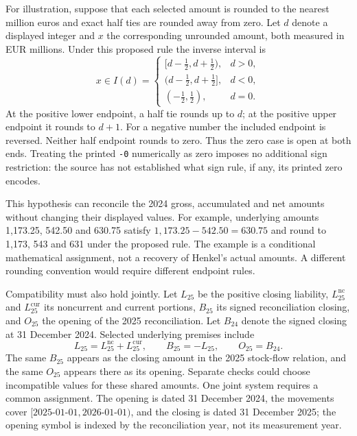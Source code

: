 For illustration, suppose that each selected amount is rounded to the nearest
million euros and exact half ties are rounded away from zero. Let $d$ denote
a displayed integer and $x$ the corresponding unrounded amount, both measured
in EUR millions. Under this proposed rule the inverse interval is
\begin{equation}
\label{eq:henkel-proposed-rounding}
 x\in I(d)=
 \begin{cases}
 [d-\tfrac12,d+\tfrac12),&d>0,\\
 (d-\tfrac12,d+\tfrac12],&d<0,\\
 (-\tfrac12,\tfrac12),&d=0.
 \end{cases}
\end{equation}
At the positive lower endpoint, a half tie rounds up to $d$; at the positive
upper endpoint it rounds to $d+1$. For a negative number the included endpoint
is reversed. Neither half endpoint rounds to zero. Thus the zero case is open
at both ends. Treating the printed \texttt{-0} numerically as zero imposes no
additional sign restriction: the source has not established what sign rule,
if any, its printed zero encodes.

This hypothesis can reconcile the 2024 gross, accumulated and net amounts
without changing their displayed values. For example, underlying amounts
1,173.25, 542.50 and 630.75 satisfy
$1{,}173.25-542.50=630.75$ and round to 1,173, 543 and 631 under the proposed
rule. The example is a conditional mathematical assignment, not a recovery
of Henkel's actual amounts. A different rounding convention would require
different endpoint rules.

Compatibility must also hold jointly. Let $L_{25}$ be the positive closing
liability, $L^{\mathrm{nc}}_{25}$ and $L^{\mathrm{cur}}_{25}$ its noncurrent and
current portions, $B_{25}$ its signed reconciliation closing, and $O_{25}$
the opening of the 2025 reconciliation. Let $B_{24}$
denote the signed closing at 31 December 2024. Selected underlying premises
include
\begin{equation}
\label{eq:henkel-shared-measurements}
 L_{25}=L^{\mathrm{nc}}_{25}+L^{\mathrm{cur}}_{25},
 \qquad B_{25}=-L_{25},
 \qquad O_{25}=B_{24}.
\end{equation}
The same $B_{25}$ appears as the closing amount in the 2025 stock-flow
relation, and the same $O_{25}$ appears there as its opening. Separate checks
could choose incompatible values for these shared amounts. One joint system
requires a common assignment. The opening is dated 31 December 2024, the
movements cover $[2025\text{-}01\text{-}01,2026\text{-}01\text{-}01)$, and
the closing is dated 31 December 2025; the opening symbol is indexed by the
reconciliation year, not its measurement year.

